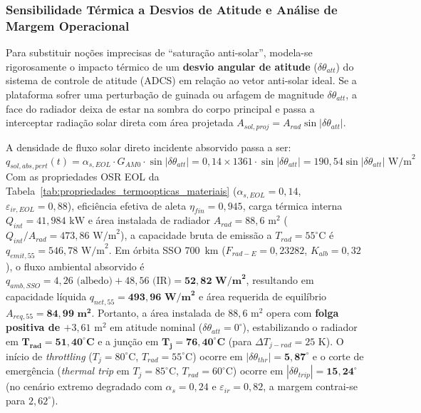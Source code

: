 \subsubsection{Sensibilidade Térmica a Desvios de Atitude e Análise de Margem Operacional}

Para substituir noções imprecisas de ``saturação anti-solar'', modela-se rigorosamente o impacto térmico de um \textbf{desvio angular de atitude} ($\delta \theta_{att}$) do sistema de controle de atitude (ADCS) em relação ao vetor anti-solar ideal. Se a plataforma sofrer uma perturbação de guinada ou arfagem de magnitude $\delta \theta_{att}$, a face do radiador deixa de estar na sombra do corpo principal e passa a interceptar radiação solar direta com área projetada $A_{sol,proj} = A_{rad} \sin |\delta \theta_{att}|$.

A densidade de fluxo solar direto incidente absorvido passa a ser:
\begin{equation}
    q_{sol,abs,pert}(t) = \alpha_{s,EOL} \cdot G_{AM0} \cdot \sin |\delta \theta_{att}| = 0{,}14 \times 1361 \cdot \sin |\delta \theta_{att}| = 190{,}54 \sin |\delta \theta_{att}|\text{ W/m}^2
    \label{eq:fluxo_solar_perturba_atitude}
\end{equation}
Com as propriedades OSR EOL da Tabela~\ref{tab:propriedades_termoopticas_materiais} ($\alpha_{s,EOL}=0{,}14$, $\varepsilon_{ir,EOL}=0{,}88$), eficiência efetiva de aleta $\eta_{fin}=0{,}945$, carga térmica interna $Q_{int}=41{,}984\text{ kW}$ e área instalada de radiador $A_{rad}=88{,}6\text{ m}^2$ ($Q_{int}/A_{rad} = 473{,}86\text{ W/m}^2$), a capacidade bruta de emissão a $T_{rad}=55^\circ\text{C}$ é $q_{emit,55} = 546{,}78\text{ W/m}^2$. Em órbita SSO 700~km ($F_{rad-E}=0{,}23282$, $K_{alb}=0{,}32$), o fluxo ambiental absorvido é $q_{amb,SSO} = 4{,}26\text{ (albedo)} + 48{,}56\text{ (IR)} = \mathbf{52{,}82\text{ W/m}^2}$, resultando em capacidade líquida $q_{net,55} = \mathbf{493{,}96\text{ W/m}^2}$ e área requerida de equilíbrio $A_{req,55} = \mathbf{84{,}99\text{ m}^2}$. Portanto, a área instalada de $88{,}6\text{ m}^2$ opera com \textbf{folga positiva de $+3{,}61\text{ m}^2$} em atitude nominal ($\delta\theta_{att}=0^\circ$), estabilizando o radiador em $\mathbf{T_{rad}=51{,}40^\circ\text{C}}$ e a junção em $\mathbf{T_j=76{,}40^\circ\text{C}}$ (para $\Delta T_{j-rad}=25\text{ K}$). O início de \textit{throttling} ($T_j = 80^\circ\text{C}$, $T_{rad}=55^\circ\text{C}$) ocorre em $|\delta\theta_{thr}| = \mathbf{5{,}87^\circ}$ e o corte de emergência (\textit{thermal trip} em $T_j = 85^\circ\text{C}$, $T_{rad}=60^\circ\text{C}$) ocorre em $|\delta\theta_{trip}| = \mathbf{15{,}24^\circ}$ (no cenário extremo degradado com $\alpha_{s}=0{,}24$ e $\varepsilon_{ir}=0{,}82$, a margem contrai-se para $2{,}62^\circ$).

